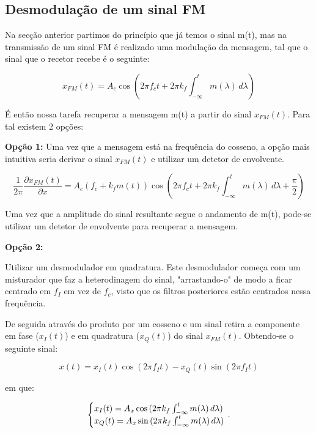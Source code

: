\newpage
\subsection{Desmodulaç\~ao de um sinal FM}
Na secção anterior partimos do princípio que já temos o sinal m(t), mas na transmiss\~ao de um sinal FM é realizado uma modulação da mensagem, tal que o sinal que o recetor recebe é o seguinte:

\begin{equation*}
    x_{FM}(t)=A_c \cos{(2\pi f_c t + 2 \pi k_f  \int_{-\infty}^{t} m(\lambda) \,d\lambda)}
\end{equation*}

É então nossa tarefa recuperar a mensagem m(t) a partir do sinal $x_{FM}(t)$. Para tal existem 2 opções:

\vspace{0.5em}
\textbf{Opção 1:}
Uma vez que a mensagem está na frequência do cosseno, a opção mais intuitiva seria derivar o sinal $x_{FM}(t)$ e utilizar um detetor de envolvente.

\begin{equation*}
    \frac{1}{2\pi} \frac{\partial x_{FM}(t)}{\partial x} =
    A_c (f_c + k_f m(t))\cos{\left(2\pi f_c t + 2 \pi k_f  \int_{-\infty}^{t} m(\lambda) \,d\lambda + \frac{\pi}{2}\right)}
\end{equation*}

Uma vez que a amplitude do sinal resultante segue o andamento de m(t), pode-se utilizar um detetor de envolvente para recuperar a mensagem.

\vspace{1.5em}

\textbf{Opção 2:}

Utilizar um desmodulador em quadratura. 
Este desmodulador começa com um misturador que faz a heterodinagem do sinal, "arrastando-o" de modo a ficar centrado em $f_I$ em vez de $f_c$, visto que os filtros posteriores estão centrados nessa frequência.

De seguida através do produto por um cosseno e um sinal retira a componente em fase ($x_I(t)$) e em quadratura ($x_Q(t)$) do sinal $x_{FM}(t)$. Obtendo-se o seguinte sinal:

\begin{equation*}
    x(t)=x_I(t)\cos{(2 \pi f_I t)} - x_Q(t)\sin{(2 \pi f_I t)}
\end{equation*}

em que:

\begin{equation*}
  \left\{\begin{array}{@{}l@{}}
    x_I(t)= A_x \cos{(2 \pi k_f  \int_{-\infty}^{t} m(\lambda) \,d\lambda)}\\
    x_Q(t)= A_x \sin{(2 \pi k_f  \int_{-\infty}^{t} m(\lambda) \,d\lambda)}
  \end{array}\right.\,.
\end{equation*}

